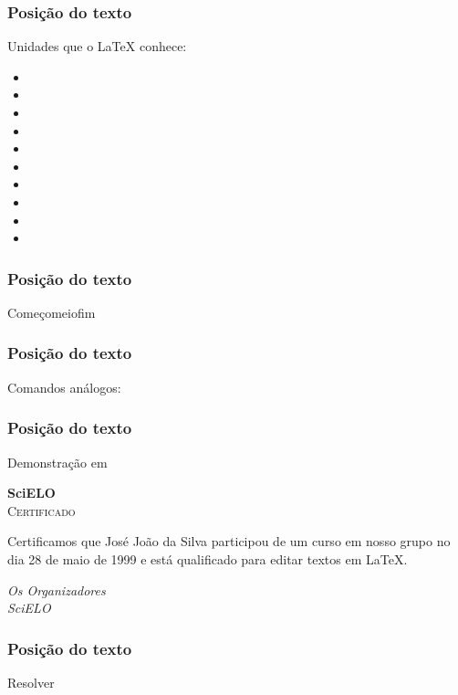 \begin{frame}[fragile]
  \frametitle{Posição do texto}
  \LARGE
  Unidades que o \LaTeX{} conhece:

  \begin{multicols}{2}
    \begin{itemize}
      \item{}
      \item{}
      \item{}
      \item{}
      \item{}
      \item{}
      \item\latexcode{\textheight}
      \item\latexcode{\textwidth}
      \item\latexcode{\pageheight}
      \item\latexcode{\pageheight}
    \end{itemize}
  \end{multicols}
\end{frame}

\begin{frame}[fragile]
  \frametitle{Posição do texto}
  \LARGE
  \vspace{1em}

  Começo\hfill meio\hfill fim
\end{frame}

\begin{frame}[fragile]
  \frametitle{Posição do texto}
  \LARGE
  Comandos análogos:

  \latexcode{\vspace{comprimento}}
  \vspace{1em}

  \latexcode{\vfill}
\end{frame}

\begin{frame}
  \frametitle{Posição do texto}
  \huge
  Demonstração em 
\end{frame}

\begin{frame}[plain]
  \begin{center}
    {\huge\textbf{SciELO}}\\[2em]
    {\LARGE\textsc{Certificado}}
  \end{center}

    \noindent Certificamos que José João da Silva participou de um curso em
    nosso grupo no dia 28 de maio de 1999 e está qualificado para editar textos
    em \LaTeX.

    \vfill
    \begin{flushright}
      \emph{Os Organizadores}\\
      \emph{SciELO}\\
    \end{flushright}
\end{frame}

\begin{frame}
  \frametitle{Posição do texto}
  \huge
  Resolver 
\end{frame}
